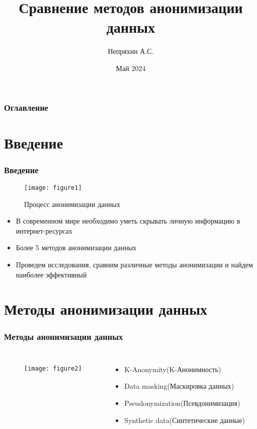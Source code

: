 \documentclass[handout]{beamer}
\title{Сравнение методов анонимизации данных}
\author{Непряхин А.С.}
\date{Май 2024}
\begin{document}
\maketitle

\begin{frame}
    \frametitle{Оглавление}
    \tableofcontents
\end{frame}

\section{Введение}
\begin{frame}
    \frametitle{Введение}
    
     \begin{figure}[ht!]
       \texttt{[image: figure1]}
       \caption{Процесс анонимизации данных}
       \label{fig:1}
   \end{figure}
   
    \begin{itemize}
        \item В современном мире необходимо уметь скрывать личную информацию в интернет-ресурсах
        \item Более 5 методов анонимизации данных
        \item Проведем исследования, сравним различные методы анонимизации и найдем наиболее эффективный
    \end{itemize}
\end{frame}

\section{Методы анонимизации данных}
\begin{frame}
    \frametitle{Методы анонимизации данных}

    \begin{columns}
        \begin{figure}[ht!]
       \texttt{[image: figure2]}
       \label{fig:2}
   \end{figure}

       \begin{itemize}
       
        \item K-Anonymity(K-Анонимность)
        
        \item Data masking(Маскировка данных)
        
        \item Pseudonymization(Псевдонимизация)
        
        \item Synthetic data(Синтетические данные)
    \end{itemize}
    \end{columns}
\end{frame}
\end{document}
